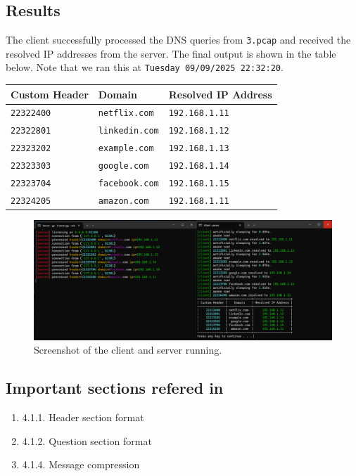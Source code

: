 \documentclass{article}
\begin{document}
\subsection{Results}
The client successfully processed the DNS queries from \texttt{3.pcap} and received the resolved IP addresses from the server. The final output is shown in the table below.
Note that we ran this at \texttt{Tuesday 09/09/2025 22:32:20}.

\begin{center}
\begin{tabularx}{\textwidth}{|l|X|l|}
\hline
\textbf{Custom Header} & \textbf{Domain} & \textbf{Resolved IP Address} \\
\hline
\texttt{22322400} & \texttt{netflix.com} & \texttt{192.168.1.11} \\
\hline
\texttt{22322801} & \texttt{linkedin.com} & \texttt{192.168.1.12} \\
\hline
\texttt{22323202} & \texttt{example.com} & \texttt{192.168.1.13} \\
\hline
\texttt{22323303} & \texttt{google.com} & \texttt{192.168.1.14} \\
\hline
\texttt{22323704} & \texttt{facebook.com} & \texttt{192.168.1.15} \\
\hline
\texttt{22324205} & \texttt{amazon.com} & \texttt{192.168.1.11} \\
\hline
\end{tabularx}
\end{center}

\begin{figure}[H]
    \centering
    \includegraphics[width=\textwidth]{task1.png}
    \caption{Screenshot of the client and server running.}
\end{figure}

\subsection{Important sections refered in~\cite{rfc1035}}
\begin{enumerate}
\item 4.1.1. Header section format
\item 4.1.2. Question section format 
\item 4.1.4. Message compression  
\end{enumerate}



\end{document}
